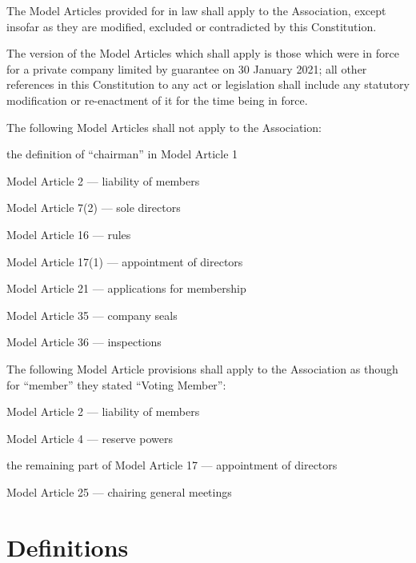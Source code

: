 \documentclass[10pt]{mk-articles-of-association}
\begin{document}
\begin{constenum}

\item The Model Articles provided for in law shall apply to the
  Association, except insofar as they are modified, excluded or
  contradicted by this Constitution.

\item The version of the Model Articles which shall apply is those
  which were in force for a private company limited by guarantee on
  30 January 2021; all other references in this Constitution
  to any act or legislation shall include any statutory modification
  or re-enactment of it for the time being in force.

\item The following Model Articles shall not apply to the Association:
  \begin{constenum}
  \item the definition of ``chairman'' in Model Article 1
  \item Model Article 2 --- liability of members
  \item Model Article 7(2) --- sole directors
  \item Model Article 16 --- rules
  \item Model Article 17(1) --- appointment of directors
  \item Model Article 21 --- applications for membership
  \item Model Article 35 --- company seals
  \item Model Article 36 --- inspections
  \end{constenum}

\item The following Model Article provisions shall apply to the Association
  as though for ``member'' they stated ``Voting Member'':

  \begin{constenum}
  \item Model Article 2 --- liability of members
  \item Model Article 4 --- reserve powers
  \item the remaining part of Model Article 17 --- appointment of directors
  \item Model Article 25 --- chairing general meetings
  \end{constenum}

\end{constenum}

\section{Definitions}
\end{document}
